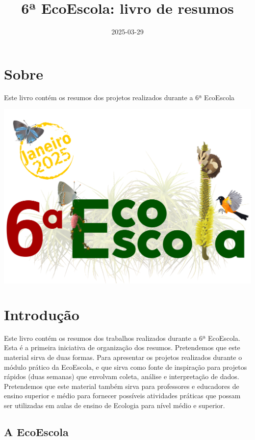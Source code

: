\documentclass[
]{book}
\title{6ª EcoEscola: livro de resumos}
\author{}
\date{\vspace{-2.5em}2025-03-29}
\begin{document}
\maketitle

{
\setcounter{tocdepth}{1}
\tableofcontents
}
\chapter{Sobre}\label{sobre}

Este livro contém os resumos dos projetos realizados durante a 6ª EcoEscola

\includegraphics{figs/ecoescolalogo.png}

\chapter{Introdução}\label{introduuxe7uxe3o}

Este livro contém os resumos dos trabalhos realizados durante a 6ª EcoEscola.
Esta é a primeira iniciativa de organização dos resumos. Pretendemos que este
material sirva de duas formas. Para apresentar os projetos realizados durante
o módulo prático da EcoEscola, e que sirva como fonte de inspiração para projetos
rápidos (duas semanas) que envolvam coleta, análise e interpretação de dados.
Pretendemos que este material também sirva para professores e educadores de
ensino superior e médio para fornecer possíveis atividades práticas que possam
ser utilizadas em aulas de ensino de Ecologia para nível médio e superior.

\section{A EcoEscola}\label{a-ecoescola}
\end{document}
